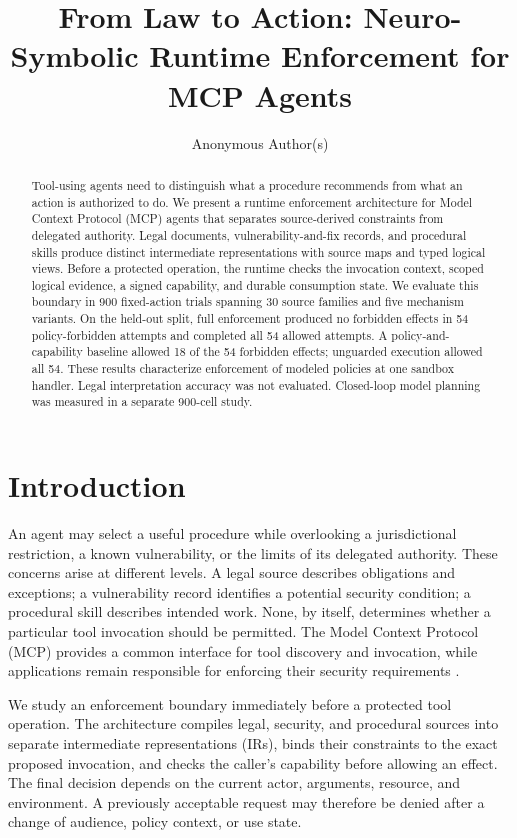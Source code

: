 \documentclass{article}
\title{From Law to Action: Neuro-Symbolic Runtime Enforcement for MCP Agents}
\author{Anonymous Author(s)}
\begin{document}
\maketitle

\begin{abstract}
Tool-using agents need to distinguish what a procedure recommends from what an action is authorized to do. We present a runtime enforcement architecture for Model Context Protocol (MCP) agents that separates source-derived constraints from delegated authority. Legal documents, vulnerability-and-fix records, and procedural skills produce distinct intermediate representations with source maps and typed logical views. Before a protected operation, the runtime checks the invocation context, scoped logical evidence, a signed capability, and durable consumption state. We evaluate this boundary in 900 fixed-action trials spanning 30 source families and five mechanism variants. On the held-out split, full enforcement produced no forbidden effects in 54 policy-forbidden attempts and completed all 54 allowed attempts. A policy-and-capability baseline allowed 18 of the 54 forbidden effects; unguarded execution allowed all 54. These results characterize enforcement of modeled policies at one sandbox handler. Legal interpretation accuracy was not evaluated. Closed-loop model planning was measured in a separate 900-cell study.
\end{abstract}

\section{Introduction}

An agent may select a useful procedure while overlooking a jurisdictional restriction, a known vulnerability, or the limits of its delegated authority. These concerns arise at different levels. A legal source describes obligations and exceptions; a vulnerability record identifies a potential security condition; a procedural skill describes intended work. None, by itself, determines whether a particular tool invocation should be permitted. The Model Context Protocol (MCP) provides a common interface for tool discovery and invocation, while applications remain responsible for enforcing their security requirements \citep{mcp,mcp-auth}.

We study an enforcement boundary immediately before a protected tool operation. The architecture compiles legal, security, and procedural sources into separate intermediate representations (IRs), binds their constraints to the exact proposed invocation, and checks the caller's capability before allowing an effect. The final decision depends on the current actor, arguments, resource, and environment. A previously acceptable request may therefore be denied after a change of audience, policy context, or use state.
\end{document}
